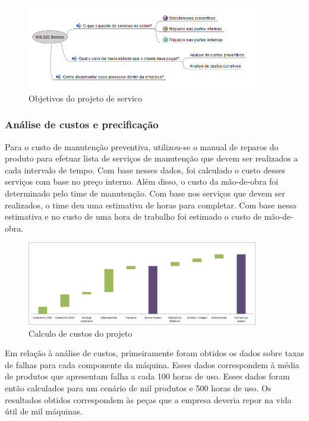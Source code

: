 \documentclass[12pt]{article}
\begin{document}
\begin{figure}[h!]
	\centering
	\includegraphics[width=0.9\textwidth]{img/ws220.png}
	\caption{Objetivos do projeto de servico}
	\label{fig:service}
\end{figure}

\subsubsection{Análise de custos e precificação}

	Para o custo de manutenção preventiva, utilizou-se o manual de reparos do produto para efetuar lista de serviços de manutenção que devem ser realizados a cada intervalo de tempo. Com base nesses dados, foi calculado o custo desses serviços com base no preço interno. Além disso, o custo da mão-de-obra foi determinado pelo time de manutenção. Com base nos serviços que devem ser realizados, o time deu uma estimativa de horas para completar. Com base nessa estimativa e no custo de uma hora de trabalho foi estimado o custo de mão-de-obra.

\begin{figure}[h!]
	\centering
	\includegraphics[width=0.9\textwidth]{img/ws220-waterfall.png}
	\caption{Calculo de custos do projeto}
	\label{fig:ws-waterfall}
\end{figure}

	Em relação à análise de custos, primeiramente foram obtidos os dados sobre taxas de falhas para cada componente da máquina. Esses dados correspondem à média de produtos que apresentam falha a cada 100 horas de uso. Esses dados foram então calculados para um cenário de mil produtos e 500 horas de uso. Os resultados obtidos correspondem às peças que a empresa deveria repor na vida útil de mil máquinas. 
	
\end{document}
